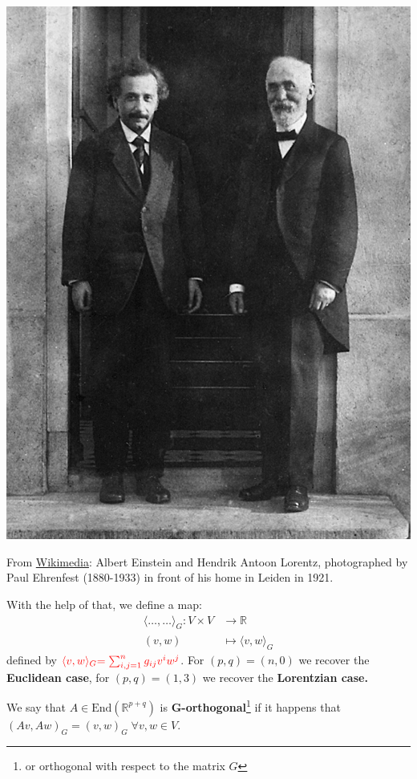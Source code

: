 \documentclass[../main.tex]{subfiles}
\begin{document}
\begin{marginfigure}[-10mm]
	\includegraphics[width=1\linewidth]{images/Einstein_en_Lorentz.jpg}
	\caption[Photo of Albert Einstein and Hendrik Antoon Lorentz]{From \href{https://commons.wikimedia.org/wiki/File:Einstein_en_Lorentz.jpg}{Wikimedia}: Albert Einstein and Hendrik Antoon Lorentz, photographed by Paul Ehrenfest (1880-1933) in front of his home in Leiden in 1921.}
\end{marginfigure}
With the help of that, we define a map:
\begin{align*}
\langle\dots,\dots\rangle_G: V\times V &\xrightarrow[]{}\mathbb{R}\\
(v,w) &\mapsto\langle v,w\rangle_G
\end{align*}
defined by \({\color{red} \langle v,w \rangle_G} {\color{red}=\sum_{i,j=1}^n g_{ij}v^iw^j}\). For $(p,q)=(n,0)$ we recover the \textbf{Euclidean case}, for $(p,q)=(1,3)$ we recover the \textbf{Lorentzian case.}%
\begin{definition}[G-orthogonal]
We say that $A\in \textrm{End}(\mathbb{R}^{p+q})$ is \textbf{G-orthogonal}\footnote{or orthogonal with respect to the matrix $G$} if it happens that $({{A}}v,{{A}}w)_G=(v,w)_G \; \forall v,w\in V$.
\end{definition}
\end{document}
